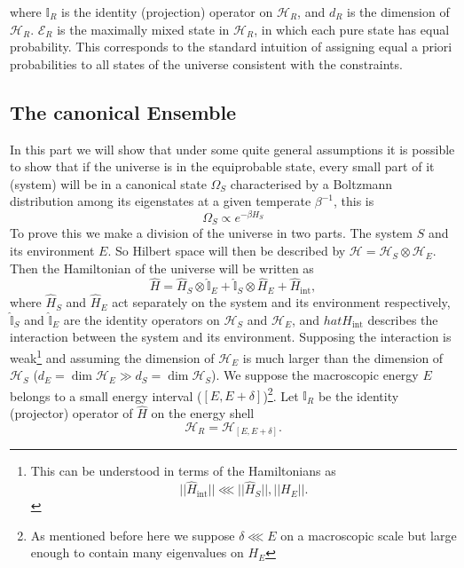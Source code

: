 where $\mathbb{I}_{R}$ is the identity (projection) operator on $\mathcal{H}_R$, and $d_R$ is the dimension of $\mathcal{H}_R$. $\mathcal{E}_R$ is the maximally mixed state in $\mathcal{H}_R$, in which each pure state has equal probability. This corresponds to the standard intuition of assigning equal a priori probabilities to all states of the universe consistent with the constraints.
\subsection{The canonical Ensemble}
In this part we will show that under some quite general assumptions it is possible to show that if the universe is in the equiprobable state, every small part of it (system) will be in a canonical state $\Omega_{S}$ characterised by a Boltzmann distribution among its eigenstates at a given temperate $\beta^{-1}$, this is
\begin{equation}
\Omega_S \propto e^{-\beta H_{S}}
\label{CH1:Canonical_form}
\end{equation}
To prove this we make a division of the universe in two parts. The system $S$ and its environment $E$. So Hilbert space will then be described by $\mathcal{H}=\mathcal{H}_{S}\otimes\mathcal{H}_E$. Then the Hamiltonian of the universe will be written as
\begin{equation}
\hat{H}=\hat{H}_{S} \otimes \hat{\mathbb{I}}_{E}+\hat{\mathbb{I}}_{S} \otimes \hat{H}_{E}+\hat{H}_{\mathrm{int}},
\label{CH1:Hamiltonian_split_env_system}
\end{equation}
where $\hat{H}_S$ and $\hat{H}_E$ act separately on the system and its environment respectively, $\hat{\mathbb{I}}_{S}$ and $\hat{\mathbb{I}}_{E}$ are the identity operators on $\mathcal{H}_S$ and $\mathcal{H}_E$, and $hat{H}_{\mathrm{int}}$ describes the interaction between the system and its environment. Supposing the interaction is weak\footnote{This can be understood in terms of the Hamiltonians as
\[||\hat{H}_{\mathrm{int}}||\lll ||\hat{H}_{S}||, ||H_{E}||.\]} and assuming the dimension of $\mathcal{H}_E$ is much larger than the dimension of $\mathcal{H}_S$ ($d_{E}=\operatorname{dim} \mathcal{H}_{E} \gg d_{S}=\operatorname{dim} \mathcal{H}_{S}$). We suppose the macroscopic energy $E$ belongs to a small energy interval ($[E,E+\delta]$)\footnote{As mentioned before here we suppose $\delta\lll E$ on a macroscopic scale but large enough to contain many eigenvalues on $H_E$}. Let $\mathbb{I}_{R}$ be the identity (projector) operator of $\hat{H}$ on the energy shell 
\begin{equation}
\mathcal{H}_{R}=\mathcal{H}_{[E, E+\delta]}.
\end{equation}
